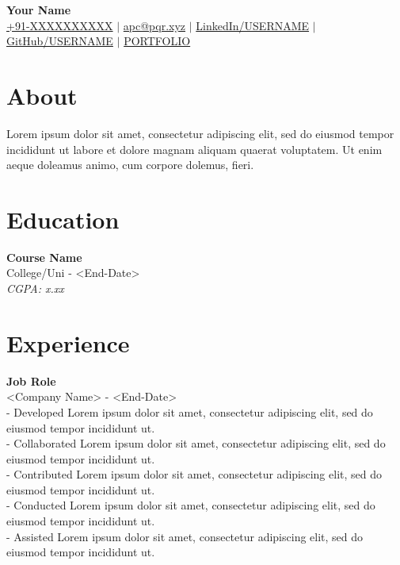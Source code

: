 \documentclass[a4paper,11pt]{article}
\begin{document}
	\begin{center}
		{\LARGE \textbf{Your Name}} \\ \vspace{5pt}
		\small \href{tel:+91XXXXXXXXXX}{+91-XXXXXXXXXX}  $\vert$ \href{mailto:abc@pqr.xyz}{apc@pqr.xyz} $\vert$  \href{https://linkedin.com/in/USERNAME}{LinkedIn/USERNAME} $\vert$
		\href{https://github.com/USERNAME}{GitHub/USERNAME} $\vert$
		\href{https://xyz.com}{PORTFOLIO} %
	\end{center}
	\vspace{-0.5cm}
	\section*{About}
	Lorem ipsum dolor sit amet, consectetur adipiscing elit, sed do eiusmod tempor incididunt ut labore et dolore magnam aliquam quaerat voluptatem. Ut enim aeque doleamus animo, cum corpore dolemus, fieri.
	\vspace{-0.3cm}
	\section*{Education}
	\textbf{Course Name} \\
	College/Uni \hfill <Start-Date> - <End-Date> \\
	\textit{CGPA: x.xx}
	\vspace{-0.3cm}
	\section*{Experience}
	\textbf{Job Role}\\
	<Company Name> \hfill <Start-Date> - <End-Date>\\
	- Developed Lorem ipsum dolor sit amet, consectetur adipiscing elit, sed do eiusmod tempor incididunt ut.\\
	- Collaborated Lorem ipsum dolor sit amet, consectetur adipiscing elit, sed do eiusmod tempor incididunt ut.\\
	- Contributed Lorem ipsum dolor sit amet, consectetur adipiscing elit, sed do eiusmod tempor incididunt ut.\\
	- Conducted Lorem ipsum dolor sit amet, consectetur adipiscing elit, sed do eiusmod tempor incididunt ut.\\
	- Assisted Lorem ipsum dolor sit amet, consectetur adipiscing elit, sed do eiusmod tempor incididunt ut. \\
	
\end{document}
